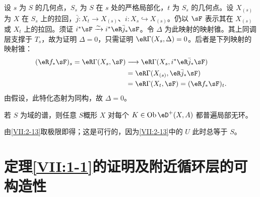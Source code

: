 设 $s$ 为 $S$ 的几何点，$S_s$ 为 $S$ 在 $s$ 处的严格局部化，$t$ 为 $S_s$ 的几何点。设 $X_{(s)}$ 为 $X$ 在 $S_s$ 上的拉回，$\bar j:X_t\to X_{(s)}$、$i:X_s\hookrightarrow X_{(s)}$。仍以 $\sF$ 表示其在 $X_{(s)}$ 或 $X_t$ 上的拉回。须证 $i^\ast\sF\iso i^\ast\eR\bar j_\ast\sF$。令 $\Delta$ 为此映射的映射锥。其上同调层支撑于 $T_s$，故为证明 $\Delta=0$，只需证明 $\eR\Gamma(X_s,\Delta)=0$。后者是下列映射的映射锥：
\begin{align*}
 (\eR f_\ast\sF)_s=\eR\Gamma(X_s,\sF)
 &\longrightarrow\eR\Gamma(X_s,i^\ast\eR\bar j_\ast\sF)\\
 &=\eR\Gamma(X_{(s)},\eR\bar j_\ast\sF)\\
 &=\eR\Gamma(X_t,\sF)=(\eR f_\ast\sF)_t.
\end{align*}
由假设，此特化态射为同构，故 $\Delta=0$。
\begin{corollary_}\label{VII:2-16}
若 $S$ 为域的谱，则任意 $S$概形 $X$ 对每个 $K\in\ob\eD^+(X,A)$ 都普遍局部无环。
\end{corollary_}
由\ref{VII:2-13}取极限即得；这是可行的，因为\ref{VII:2-13}中的 $U$ 此时总等于 $S$。

\section{定理\ref{VII:1-1}的证明及附近循环层的可构造性}\label{VII:3}
